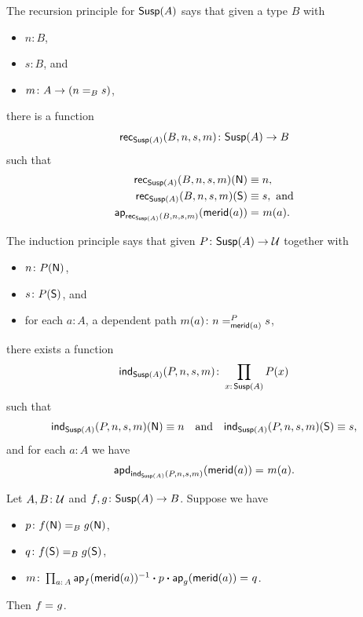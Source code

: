 The recursion principle for $\mathsf{Susp}(A)$ says that given a type $B$ with
\begin{itemize}
    \item $n\colon B$,
    \item $s\colon B$, and
    \item $m\colon A\to(n\eq Bs)$,
\end{itemize}
there is a function
\[
    \fun{rec}_{\fun{Susp}(A)}(B,n,s,m)\colon
        \fun{Susp}(A)\to B
\]
such that
\begin{align*}
    \mathsf{rec}_{\mathsf{Susp}(A)}(B,n,s,m)(\mathsf{N})&\equiv n,\\
    \mathsf{rec}_{\mathsf{Susp}(A)}(B,n,s,m)(\mathsf{S})&\equiv s,
        \text{ and}\\
    \mathsf{ap}_{\mathsf{rec}_{\mathsf{Susp}(A)}(B,n,s,m)}
        (\mathsf{merid}(a))
    &\mathrel{=_{}}m(a).
\end{align*}

The induction principle says that given $P\colon\fun{Susp}(A)\to\univ$ together with
\begin{itemize}
    \item $n\colon P(\fun{N})$,
    \item $s\colon P(\fun{S})$, and
    \item for each $a\colon A$, a dependent path $m(a)\colon n\eqt{\fun{merid}(a)}Ps$,
\end{itemize}
there exists a function
\[
    \fun{ind}_{\fun{Susp}(A)}(P,n,s,m)\colon
        \prod_{x\colon\fun{Susp}(A)}P(x)
\]
such that
\[
    \mathsf{ind}_{\mathsf{Susp}(A)}(P,n,s,m)(\mathsf{N})\equiv n
    \quad\text{and}\quad
    \mathsf{ind}_{\mathsf{Susp}(A)}(P,n,s,m)(\mathsf{S})\equiv s,
\]
and for each $a\colon A$ we have
\[
    \mathsf{apd}_{\mathsf{ind}_{\mathsf{Susp}(A)}(P,n,s,m)}
        (\mathsf{merid}(a))\mathrel{=_{}}m(a).
\]

\begin{lem}\label{lem:Susp-rec-equality}
    Let\/ $A,B\colon\univ$ and\/ $f,g\colon\fun{Susp}(A)\to B$. Suppose we have
    \begin{itemize}
        \item $p\colon f(\fun N)\eq{B}g(\fun N)$,
        \item $q\colon f(\fun S)\eq{B}g(\fun S)$,
        \item $m\colon\prod_{a\colon A}\fun{ap}_f(\fun{merid}(a))^{-1}\ct p\ct\fun{ap}_g(\fun{merid}(a))\eq{}q$.
    \end{itemize}
    Then\/ $f\mathrel{=_{}}g$.
\end{lem}

